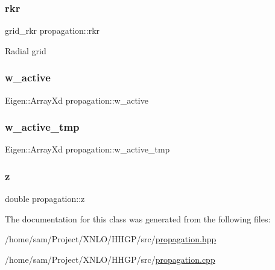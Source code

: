 \mbox{\label{classpropagation_a3d37531bb5918f972544d242aec7e72b}} 
\subsubsection{\texorpdfstring{rkr}{rkr}}
{\footnotesize\ttfamily grid\+\_\+rkr propagation\+::rkr\hspace{0.3cm}{\ttfamily [private]}}

Radial grid \mbox{\label{classpropagation_a4c24f42d4148eded469c6479d6bf1661}} 
\subsubsection{\texorpdfstring{w\+\_\+active}{w\_active}}
{\footnotesize\ttfamily Eigen\+::\+Array\+Xd propagation\+::w\+\_\+active}

\mbox{\label{classpropagation_a07a80b67a345e3e9d8e934d2265ba288}} 
\subsubsection{\texorpdfstring{w\+\_\+active\+\_\+tmp}{w\_active\_tmp}}
{\footnotesize\ttfamily Eigen\+::\+Array\+Xd propagation\+::w\+\_\+active\+\_\+tmp\hspace{0.3cm}{\ttfamily [private]}}

\mbox{\label{classpropagation_aeacfc091fafd1fdb1af4536f6f587e55}} 
\subsubsection{\texorpdfstring{z}{z}}
{\footnotesize\ttfamily double propagation\+::z}



The documentation for this class was generated from the following files\+:\begin{DoxyCompactItemize}
\item 
/home/sam/\+Project/\+X\+N\+L\+O/\+H\+H\+G\+P/src/\hyperlink{propagation_8hpp}{propagation.\+hpp}\item 
/home/sam/\+Project/\+X\+N\+L\+O/\+H\+H\+G\+P/src/\hyperlink{propagation_8cpp}{propagation.\+cpp}\end{DoxyCompactItemize}
